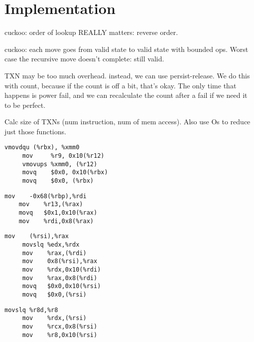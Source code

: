 \section{Implementation}

cuckoo:
order of lookup REALLY matters: reverse order.




cuckoo: each move goes from valid state to valid state with bounded
ops. Worst case the recursive move doesn't complete: still valid.

TXN may be too much overhead. instead, we can use persist-release. We do this
with count, because if the count is off a bit, that's okay. The only time that
happens is power fail, and we can recalculate the count after a fail if we need
it to be perfect.



Calc size of TXNs (num instruction, num of mem access). Also use Os to reduce just
those functions.



\begin{lstlisting}[caption={Transaction code, do\_move, optimized for speed.
Five instructions, five memory accesses (four writes).},label=lst:moveO3]
     vmovdqu (%rbx), %xmm0
     mov     %r9, 0x10(%r12)
     vmovups %xmm0, (%r12)
     movq    $0x0, 0x10(%rbx)
     movq    $0x0, (%rbx)
\end{lstlisting}

\begin{lstlisting}[caption={Transaction code, do\_insert, optimized for speed.
Four instructions, four memory accesses (three writes).},label=lst:insertO3]
    mov    -0x68(%rbp),%rdi
    mov    %r13,(%rax)
    movq   $0x1,0x10(%rax)
    mov    %rdi,0x8(%rax)
\end{lstlisting}








\begin{lstlisting}[caption={Transaction code, do\_move, optimized for size.
Eight instructions, seven memory accesses (five writes).},label=lst:moveOs]
     mov    (%rsi),%rax
     movslq %edx,%rdx
     mov    %rax,(%rdi)
     mov    0x8(%rsi),%rax
     mov    %rdx,0x10(%rdi)
     mov    %rax,0x8(%rdi)
     movq   $0x0,0x10(%rsi)
     movq   $0x0,(%rsi)
\end{lstlisting}

\begin{lstlisting}[caption={Transaction code, do\_insert, optimized for size.
Four instructions, three memory accesses (three writes).},label=lst:insertOs]
     movslq %r8d,%r8
     mov    %rdx,(%rsi)
     mov    %rcx,0x8(%rsi)
     mov    %r8,0x10(%rsi)
\end{lstlisting}



